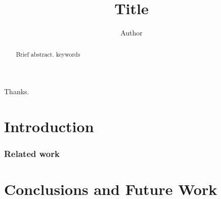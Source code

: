 \documentclass{kaureport}
\title{Title}
\author{Author}
\institute{Department}
\begin{document}
\frontmatter
\begin{abstract}
  Brief abstract.
  \keywords keywords
\end{abstract}
\begin{acknowledgements}
  Thanks.
\end{acknowledgements}
\tableofcontents
\mainmatter
\part{Introduction}
\section{Related work}
\part{Conclusions and Future Work}
\end{document}
